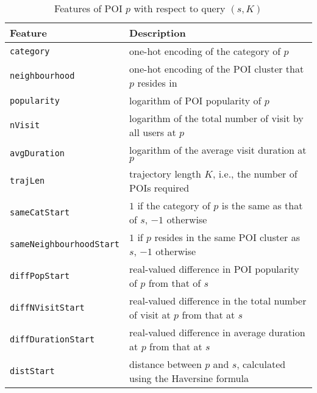 \begin{table*}[ht]
\caption{Features of POI $p$ with respect to query $(s,K)$}
\label{tab:poifeature}
\centering


\setlength{\tabcolsep}{10pt} %
\begin{tabular}{l|l} \hline
\textbf{Feature}       & \textbf{Description} \\ \hline
\texttt{category}      & one-hot encoding of the category of $p$ \\
\texttt{neighbourhood} & one-hot encoding of the POI cluster that $p$ resides in \\
\texttt{popularity}    & logarithm of POI popularity of $p$ \\
\texttt{nVisit}        & logarithm of the total number of visit by all users at $p$ \\
\texttt{avgDuration}  & logarithm of the average visit duration at $p$ \\
\hline

\texttt{trajLen}           & trajectory length $K$, i.e., the number of POIs required \\
\texttt{sameCatStart}      & $1$ if the category of $p$ is the same as that of $s$, $-1$ otherwise \\
\texttt{sameNeighbourhoodStart} & $1$ if $p$ resides in the same POI cluster as $s$, $-1$ otherwise \\
\texttt{diffPopStart}    & real-valued difference in POI popularity of $p$ from that of $s$ \\
\texttt{diffNVisitStart}        & real-valued difference in the total number of visit at $p$ from that at $s$ \\
\texttt{diffDurationStart}  & real-valued difference in average duration at $p$ from that at $s$ \\
\texttt{distStart}          & distance between $p$ and $s$, calculated using the Haversine formula \\
\hline
\end{tabular}
\end{table*}




